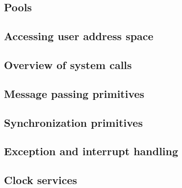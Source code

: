 \subsection{Pools}

\subsection{Accessing user address space}

\subsection{Overview of system calls}

\subsection{Message passing primitives}

\subsection{Synchronization primitives}

\subsection{Exception and interrupt handling}

\subsection{Clock services}
